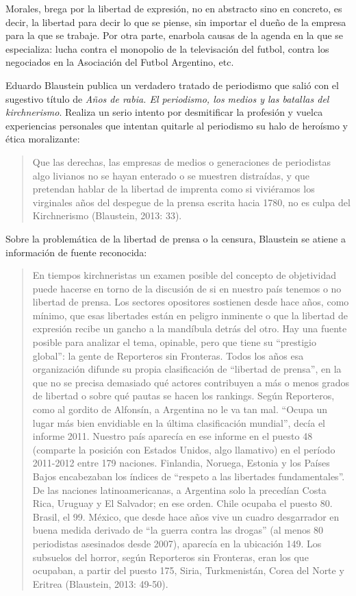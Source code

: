 Morales, brega por la libertad de expresión, no en abstracto sino en concreto, es decir, la libertad para decir lo que se piense, sin importar el dueño de la empresa para la que se trabaje. Por otra parte, enarbola causas de la agenda en la que se especializa: lucha contra el monopolio de la televisación del futbol, contra los negociados en la Asociación del Futbol Argentino, etc.

Eduardo Blaustein publica un verdadero tratado de periodismo que salió con el sugestivo título de \emph{Años de rabia. El periodismo, los medios y las batallas del kirchnerismo}. Realiza un serio intento por desmitificar la profesión y vuelca experiencias personales que intentan quitarle al periodismo su halo de heroísmo y ética moralizante:

\begin{quote}
Que las derechas, las empresas de medios o generaciones de periodistas algo livianos no se hayan enterado o se muestren distraídas, y que pretendan hablar de la libertad de imprenta como si viviéramos los virginales años del despegue de la prensa escrita hacia 1780, no es culpa del Kirchnerismo (Blaustein, 2013: 33).
\end{quote}

Sobre la problemática de la libertad de prensa o la censura, Blaustein se atiene a información de fuente reconocida:

\begin{quote}
En tiempos kirchneristas un examen posible del concepto de objetividad puede hacerse en torno de la discusión de si en nuestro país tenemos o no libertad de prensa. Los sectores opositores sostienen desde hace años, como mínimo, que esas libertades están en peligro inminente o que la libertad de expresión recibe un gancho a la mandíbula detrás del otro. Hay una fuente posible para analizar el tema, opinable, pero que tiene su \enquote{prestigio global}: la gente de Reporteros sin Fronteras. Todos los años esa organización difunde su propia clasificación de \enquote{libertad de prensa}, en la que no se precisa demasiado qué actores contribuyen a más o menos grados de libertad o sobre qué pautas se hacen los rankings. Según Reporteros, como al gordito de Alfonsín, a Argentina no le va tan mal. \enquote{Ocupa un lugar más bien envidiable en la última clasificación mundial}, decía el informe 2011. Nuestro país aparecía en ese informe en el puesto 48 (comparte la posición con Estados Unidos, algo llamativo) en el período 2011-2012 entre 179 naciones. Finlandia, Noruega, Estonia y los Países Bajos encabezaban los índices de \enquote{respeto a las libertades fundamentales}. De las naciones latinoamericanas, a Argentina solo la precedían Costa Rica, Uruguay y El Salvador; en ese orden. Chile ocupaba el puesto 80. Brasil, el 99. México, que desde hace años vive un cuadro desgarrador en buena medida derivado de \enquote{la guerra contra las drogas} (al menos 80 periodistas asesinados desde 2007), aparecía en la ubicación 149. Los subsuelos del horror\textquotesingle, según Reporteros sin Fronteras, eran los que ocupaban, a partir del puesto 175, Siria, Turkmenistán, Corea del Norte y Eritrea (Blaustein, 2013: 49-50).
\end{quote}

